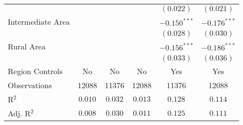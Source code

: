 \begin{center}
\begin{tiny}
\begin{longtable}{l@{} c@{} c@{} c@{} c@{} c@{}}
                                                      &                &                  &                & $(0.022)$        & $(0.021)$        \\
\quad Intermediate Area                               &                &                  &                & $-0.150^{***}$   & $-0.176^{***}$   \\
                                                      &                &                  &                & $(0.028)$        & $(0.030)$        \\
\quad Rural Area                                      &                &                  &                & $-0.156^{***}$   & $-0.186^{***}$   \\
                                                      &                &                  &                & $(0.033)$        & $(0.036)$        \\
\hline
Region Controls                                       & No             & No               & No             & Yes              & Yes              \\
Observations                                          & 12088          & 11376            & 12088          & 11376            & 12088            \\
R$^2$                                                 & $0.010$        & $0.032$          & $0.013$        & $0.128$          & $0.114$          \\
Adj. R$^2$                                            & $0.008$        & $0.030$          & $0.011$        & $0.125$          & $0.111$          \\
\end{longtable}
\end{tiny}
\end{center}
